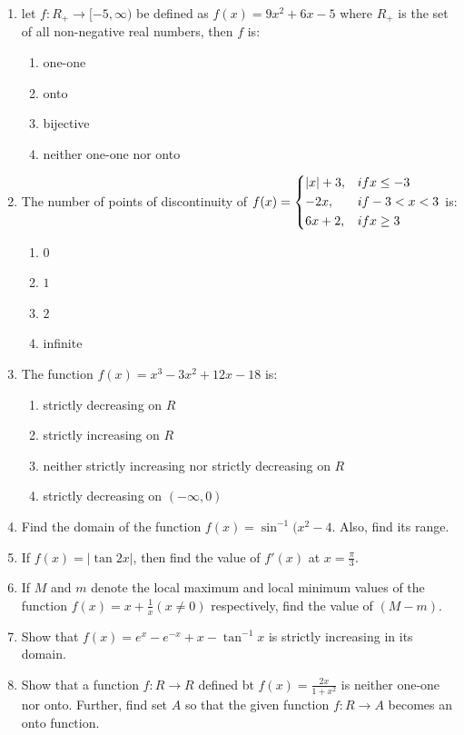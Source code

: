 \begin{enumerate}
       \item let $f:R_{+} \rightarrow [-5, \infty)$ be defined as $f(x) = 9x^{2} +6x -5$ where $R_{+}$ is the set of all non-negative real numbers, then $f$ is:
	       \begin{enumerate}
		       \item one-one
		       \item onto
		       \item bijective
		       \item neither one-one nor onto
	       \end{enumerate}
       \item The number of points of discontinuity of $f(x) = \begin{dcases}
		       |x|+3, & if x\leq-3  \\
		       -2x, & if -3<x<3 \\
		       6x+2, & if x\geq3 
       \end{dcases}$ is:
		\begin{enumerate}
			\item $0$
			\item $1$
			\item $2$
			\item infinite
		\end{enumerate}
	\item The function $f(x) = x^{3} - 3x^{2} +12x -18$ is:
		\begin{enumerate}
			\item strictly decreasing on $R$
			\item strictly increasing on $R$
			\item neither strictly increasing nor strictly decreasing on $R$
			\item strictly decreasing on $(-\infty, 0)$
		\end{enumerate}
	\item Find the domain of the function $f(x) = \sin^{-1}(x^{2} - 4$. Also, find its range.
	\item If $f(x) = |\tan 2x|$, then find the value of $f'(x)$ at $x=\frac{\pi}{3}$.
	\item If $M$ and $m$ denote the local maximum and local minimum values of the function $f(x) = x + \frac{1}{x} (x\neq0)$ respectively, find the value of $(M-m)$.
	\item Show that $f(x) = e^{x} - e^{-x} + x - \tan^{-1}x$ is strictly increasing in its domain.
	\item Show that a function $f:R \rightarrow R$ defined bt $f(x) = \frac{2x}{1+x ^{2}}$ is neither one-one nor onto. Further, find set $A$ so that the given function $f:R \rightarrow A$ becomes an onto function.

\end{enumerate}
